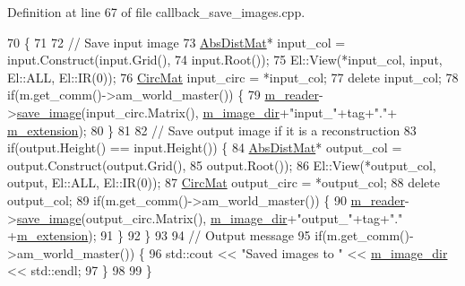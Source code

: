 Definition at line 67 of file callback\+\_\+save\+\_\+images.\+cpp.


\begin{DoxyCode}
70                                                            \{
71 
72   \textcolor{comment}{// Save input image}
73   \hyperlink{base_8hpp_a9a697a504ae84010e7439ffec862b470}{AbsDistMat}* input\_col = input.Construct(input.Grid(),
74                                           input.Root());
75   El::View(*input\_col, input, El::ALL, El::IR(0));
76   \hyperlink{base_8hpp_a48abd140bc807a8ac1381efd1bfeb375}{CircMat} input\_circ = *input\_col;
77   \textcolor{keyword}{delete} input\_col;
78   \textcolor{keywordflow}{if}(m.get\_comm()->am\_world\_master()) \{
79     \hyperlink{classlbann_1_1lbann__callback__save__images_a275e409b2b2f3ebe2baeea636e18c607}{m\_reader}->\hyperlink{classlbann_1_1generic__data__reader_a8cf298061c73f55e2fe717acd2a9f178}{save\_image}(input\_circ.Matrix(), \hyperlink{classlbann_1_1lbann__callback__save__images_aeb69e2814c78d33a93b9ddc276c4cc57}{m\_image\_dir}+\textcolor{stringliteral}{"input\_"}+tag+\textcolor{stringliteral}{"."}+
      \hyperlink{classlbann_1_1lbann__callback__save__images_a7b37fa08f49051897ef427b8c810ca3a}{m\_extension});
80   \}
81   
82   \textcolor{comment}{// Save output image if it is a reconstruction}
83   \textcolor{keywordflow}{if}(output.Height() == input.Height()) \{
84     \hyperlink{base_8hpp_a9a697a504ae84010e7439ffec862b470}{AbsDistMat}* output\_col = output.Construct(output.Grid(),
85                                               output.Root());
86     El::View(*output\_col, output, El::ALL, El::IR(0));
87     \hyperlink{base_8hpp_a48abd140bc807a8ac1381efd1bfeb375}{CircMat} output\_circ = *output\_col;
88     \textcolor{keyword}{delete} output\_col;
89     \textcolor{keywordflow}{if}(m.get\_comm()->am\_world\_master()) \{
90       \hyperlink{classlbann_1_1lbann__callback__save__images_a275e409b2b2f3ebe2baeea636e18c607}{m\_reader}->\hyperlink{classlbann_1_1generic__data__reader_a8cf298061c73f55e2fe717acd2a9f178}{save\_image}(output\_circ.Matrix(), \hyperlink{classlbann_1_1lbann__callback__save__images_aeb69e2814c78d33a93b9ddc276c4cc57}{m\_image\_dir}+\textcolor{stringliteral}{"output\_"}+tag+\textcolor{stringliteral}{"."}
      +\hyperlink{classlbann_1_1lbann__callback__save__images_a7b37fa08f49051897ef427b8c810ca3a}{m\_extension});
91     \}
92   \}
93 
94   \textcolor{comment}{// Output message}
95   \textcolor{keywordflow}{if}(m.get\_comm()->am\_world\_master()) \{
96     std::cout << \textcolor{stringliteral}{"Saved images to "} << \hyperlink{classlbann_1_1lbann__callback__save__images_aeb69e2814c78d33a93b9ddc276c4cc57}{m\_image\_dir} << std::endl;
97   \}
98 
99 \}
\end{DoxyCode}
